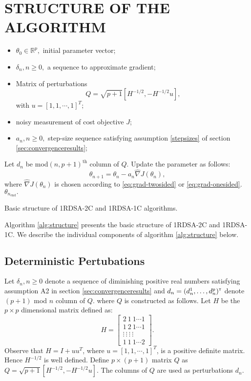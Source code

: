 \documentclass[letterpaper, 10 pt, conference]{ieeeconf}  %
\begin{document}
\section{STRUCTURE OF THE ALGORITHM}
\label{sec:algo}
\begin{algorithm}[t]
\begin{algorithmic}
\begin{itemize}
 \item $\theta_0 \in \mathbb{R}^p,$ initial parameter vector;
 \item $\delta_n, n \geq 0,$ a sequence to approximate gradient;
 \item Matrix of perturbations $$Q=\sqrt{p+1}[H^{-1/2},-H^{-1/2}u],$$ 
 with $u=[1,1,\cdots,1]^T;$
 \item noisy measurement of cost objective $J$;
 \item $a_n, n \geq 0,$ step-size sequence satisfying assumption \ref{stepsizes} of 
 section \ref{sec:convergenceresults};
\end{itemize}
	\State Let $d_n$ be mod$(n,p+1)^{\text{th}}$ column of $Q$. 
	\State Update the parameter as follows:
  \begin{equation}
  \theta_{n+1}=\theta_n-a_n \widehat\nabla J(\theta_n), \label{eq:algo}
  \end{equation}
where $\widehat\nabla J(\theta_n)$ is chosen according to \eqref{eq:grad-twosided} 
or \eqref{eq:grad-onesided}. 
\EndFor
{} $\theta_{n_{\text{end}}}.$
\end{algorithmic}
\caption{Basic structure of 1RDSA-2C and 1RDSA-1C algorithms.}
\label{alg:structure}
\end{algorithm}
Algorithm \ref{alg:structure} presents the basic structure of 
1RDSA-2C and 1RDSA-1C. We describe the individual 
components of algorithm \ref{alg:structure} below.
\subsection{Deterministic Pertubations}
Let $\delta_n, n\geq 0$ denote a sequence of diminishing positive real numbers satisfying 
assumption A2 in section \ref{sec:convergenceresults} and 
$d_n = (d_n^1,\ldots,d_n^p)^\mathsf{\scriptscriptstyle T}$ denote $(p+1)$ mod $n$ column of $Q.$
where $Q$ is constructed as follows. 
Let $H$ be the $p \times p$ dimensional matrix defined as:
\begin{equation}\label{eq:H}
H = \left[\begin{array}{cccc}
2 \ 1 \ 1 \cdots 1\\ 
1 \ 2 \ 1 \cdots 1 \\
\vdots \ \vdots \ \vdots \ \vdots\\
1 \ 1 \ 1 \cdots 2
\end{array}\right].
\end{equation}
Observe that $H=I+uu^T$, where $u=[1,1,\cdots,1]^T$, is a positive definite matrix. Hence $H^{-1/2}$ is well defined.
Define $p\times (p+1)$ matrix $Q$ as $Q=\sqrt{p+1}[H^{-1/2},-H^{-1/2}u].$ The columns of
$Q$ are used as perturbations $d_n.$
\end{document}
